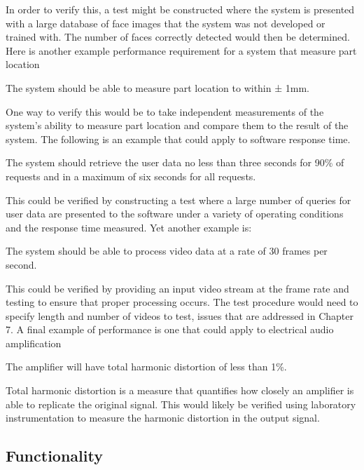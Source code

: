 In order to verify this, a test might be constructed where the system is
presented with a large database of face images that the system was not
developed or trained with. The number of faces correctly detected would
then be determined. Here is another example performance requirement for
a system that measure part location

\begin{itquote}
The system should be able to measure part location to within ± 1mm.
\end{itquote}

One way to verify this would be to take independent measurements of the
system's ability to measure part location and compare them to the result
of the system. The following is an example that could apply to software
response time.

\begin{itquote}
The system should retrieve the user data no less than three seconds for
90\% of requests and in a maximum of six seconds for all requests.
\end{itquote}

This could be verified by constructing a test where a large number of
queries for user data are presented to the software under a variety of
operating conditions and the response time measured. Yet another example
is:
\begin{itquote}
The system should be able to process video data at a rate of 30 frames
per second.
\end{itquote}

This could be verified by providing an input video stream at the frame
rate and testing to ensure that proper processing occurs. The test
procedure would need to specify length and number of videos to test,
issues that are addressed in Chapter 7. A final example of performance
is one that could apply to electrical audio amplification

\begin{itquote}
The amplifier will have total harmonic distortion of less than 1\%.
\end{itquote}

Total harmonic distortion is a measure that quantifies how closely an
amplifier is able to replicate the original signal. This would likely be
verified using laboratory instrumentation to measure the harmonic
distortion in the output signal.


\subsection*{Functionality}
\label{subsection:functionality}

